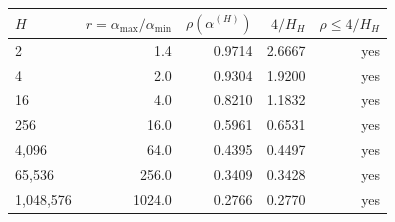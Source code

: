 \begin{tabular}{lrrrr}
\toprule
$H$ & $r=\alpha_{\max}/\alpha_{\min}$ & $\rho(\alpha^{(H)})$ & $4/H_H$ & $\rho\le 4/H_H$ \\
\midrule
2 & 1.4 & 0.9714 & 2.6667 & yes \\
4 & 2.0 & 0.9304 & 1.9200 & yes \\
16 & 4.0 & 0.8210 & 1.1832 & yes \\
256 & 16.0 & 0.5961 & 0.6531 & yes \\
4{,}096 & 64.0 & 0.4395 & 0.4497 & yes \\
65{,}536 & 256.0 & 0.3409 & 0.3428 & yes \\
1{,}048{,}576 & 1024.0 & 0.2766 & 0.2770 & yes \\
\bottomrule
\end{tabular}
